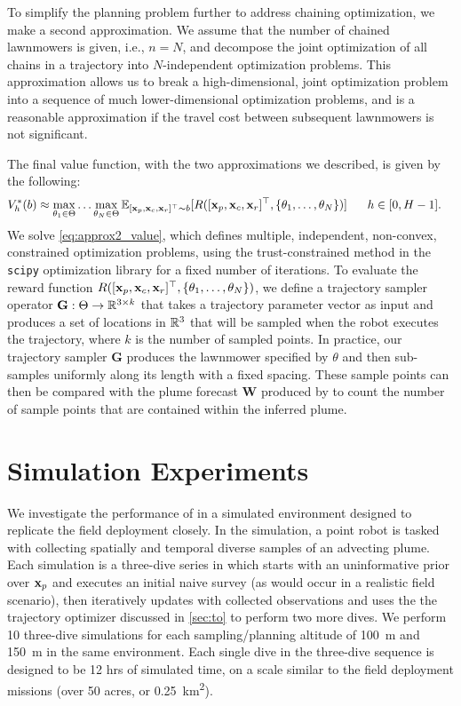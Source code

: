 To simplify the planning problem further to address chaining optimization, we make a second approximation. We assume that the number of chained lawnmowers is given, i.e., $n=N$, and decompose the joint optimization of all chains in a trajectory into $N$-independent optimization problems. This approximation allows us to break a high-dimensional, joint optimization problem into a sequence of much lower-dimensional optimization problems, and is a reasonable approximation if the travel cost between subsequent lawnmowers is not significant. 

The final \PHORTEX value function, with the two approximations we described, is given by the following:
\begin{align}
     V_h^{*}(b) &\approx  \max_{\theta_1 \in \Theta} \dots \max_{\theta_N\in \Theta} \mathbb{E}_{[\mathbf{x}_{p}, \mathbf{x}_{c}, \mathbf{x}_{r}]^\top \sim b}[R([\mathbf{x}_{p}, \mathbf{x}_{c}, \mathbf{x}_{r}]^\top, \{\theta_1, \dots, \theta_N\})] \hspace{0.6cm} h \in [0, H-1].
    \label{eq:approx2_value}
\end{align}
We solve \cref{eq:approx2_value}, which defines multiple, independent, non-convex, constrained optimization problems, using the trust-constrained method in the \texttt{scipy} optimization library for a fixed number of iterations\autocite{conn2000trust}. To evaluate the reward function $R([\mathbf{x}_{p}, \mathbf{x}_{c}, \mathbf{x}_{r}]^\top, \{\theta_1, \dots, \theta_N\})$, we define a trajectory sampler operator $\mathbf{G}: \Theta \to \mathbb{R}^{3 \times k}$ that takes a trajectory parameter vector as input and produces a set of locations in $\mathbb{R}^3$ that will be sampled when the robot executes the trajectory, where $k$ is the number of sampled points. In practice, our trajectory sampler $\mathbf{G}$ produces the lawnmower specified by $\theta$ and then sub-samples uniformly along its length with a fixed spacing. These sample points can then be compared with the plume forecast $\mathbf{W}$ produced by \PHUMES to count the number of sample points that are contained within the inferred plume.


\section{Simulation Experiments}
\label{sec:experiments}
We investigate the performance of \PHORTEX in a simulated environment designed to replicate the field deployment closely. In the simulation, a point robot is tasked with collecting spatially and temporal diverse samples of an advecting plume. Each simulation is a three-dive series in which \PHORTEX starts with an uninformative prior over $\mathbf{x}_p$ and executes an initial naive survey (as would occur in a realistic field scenario), then iteratively updates \PHUMES with collected observations and uses the the trajectory optimizer discussed in \cref{sec:to} to perform two more dives. We perform 10 three-dive simulations for each sampling/planning altitude of \SI{100}{\meter} and \SI{150}{\meter} in the same environment. Each single dive in the three-dive sequence is designed to be 12 hrs of simulated time, on a scale similar to the field deployment missions (over 50 acres, or \SI{0.25}{\kilo\meter\squared}). 

